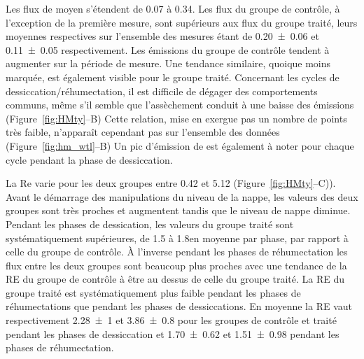 Les flux de \chh moyen s'étendent de \num{0.07} à \SI{0.34}{\uml}.
Les flux du groupe de contrôle, à l'exception de la première mesure, sont supérieurs aux flux du groupe traité, leurs moyennes respectives sur l'ensemble des mesures étant de \num{0.20(006)} et \SI{0.11(005)}{\uml} respectivement.
Les émissions du groupe de contrôle tendent à augmenter sur la période de mesure.
Une tendance similaire, quoique moins marquée, est également visible pour le groupe traité.
Concernant les cycles de dessiccation/réhumectation, il est difficile de dégager des comportements communs, même s'il semble que l'assèchement conduit à une baisse des émissions (Figure~\ref{fig:HMty}--B)
Cette relation, mise en exergue pas un nombre de points très faible, n’apparaît cependant pas sur l'ensemble des données (Figure~\ref{fig:hm_wtl}--B)
Un pic d'émission de \chh est également à noter pour chaque cycle pendant la phase de dessiccation.

La Re varie pour les deux groupes entre \num{0.42} et \SI{5.12}{\uml} (Figure~\ref{fig:HMty}--C)).
Avant le démarrage des manipulations du niveau de la nappe, les valeurs des deux groupes sont très proches et augmentent tandis que le niveau de nappe diminue.
Pendant les phases de dessication, les valeurs du groupe traité sont systématiquement supérieures, de \num{1.5} à \SI{1.8}{\uml}en moyenne par phase, par rapport à celle du groupe de contrôle.
À l'inverse pendant les phases de réhumectation les flux entre les deux groupes sont beaucoup plus proches avec une tendance de la RE du groupe de contrôle à être au dessus de celle du groupe traité.
La RE du groupe traité est systématiquement plus faible pendant les phases de réhumectations que pendant les phases de dessiccations.
En moyenne la RE vaut respectivement \num{2.28(100)} et \SI{3.86(080)}{\uml} pour les groupes de contrôle et traité pendant les phases de dessiccation et \num{1.70(062)} et \SI{1.51(098)}{\uml} pendant les phases de réhumectation.

